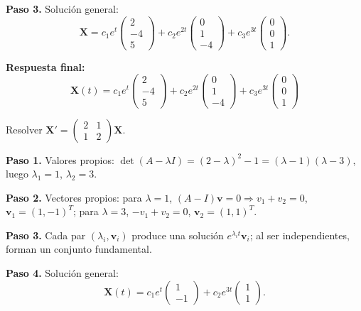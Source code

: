 \begin{example}
\begin{myproof}
\textbf{Paso 3.} Solución general:
\[
\mathbf{X}=c_1 e^{t}\begin{pmatrix}2\\-4\\5\end{pmatrix}
+c_2 e^{2t}\begin{pmatrix}0\\1\\-4\end{pmatrix}
+c_3 e^{3t}\begin{pmatrix}0\\0\\1\end{pmatrix}.
\]

\textbf{Respuesta final:}
\[
\boxed{
\mathbf{X}(t)=c_1 e^t
\begin{pmatrix}
2\\-4\\5
\end{pmatrix}
+c_2 e^{2t}
\begin{pmatrix}
0\\1\\-4
\end{pmatrix}
+c_3 e^{3t}
\begin{pmatrix}
0\\0\\1
\end{pmatrix}
}
\]
\end{myproof}
\end{example}

\begin{example}
Resolver $\mathbf{X}'=\begin{pmatrix}2&1\\1&2\end{pmatrix}\mathbf{X}$.

\begin{myproof}
\textbf{Paso 1.} Valores propios: $\det(A-\lambda I)=(2-\lambda)^2-1=(\lambda-1)(\lambda-3)$, luego $\lambda_1=1$, $\lambda_2=3$.

\textbf{Paso 2.} Vectores propios: para $\lambda=1$, $(A-I)\mathbf{v}=0\Rightarrow v_1+v_2=0$, $\mathbf{v}_1=(1,-1)^T$; para $\lambda=3$, $-v_1+v_2=0$, $\mathbf{v}_2=(1,1)^T$.

\textbf{Paso 3.} Cada par $(\lambda_i,\mathbf{v}_i)$ produce una solución $e^{\lambda_i t}\mathbf{v}_i$; al ser independientes, forman un conjunto fundamental.

\textbf{Paso 4.} Solución general:
\[
\boxed{\mathbf{X}(t)=c_1 e^{t}\begin{pmatrix}1\\-1\end{pmatrix}+c_2 e^{3t}\begin{pmatrix}1\\1\end{pmatrix}.}
\]
\end{myproof}
\end{example}

